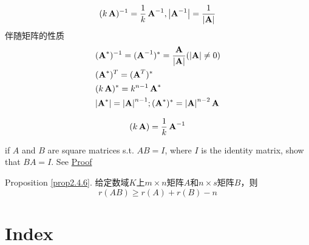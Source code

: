 \documentclass[11pt]{article}
\begin{document}
\begin{equation*}
(k\bA)^{-1}=\frac{1}{k}\bA^{-1},\abs{\bA^{-1}}=\frac{1}{\abs{\bA}}
\end{equation*}
伴随矩阵的性质
\begin{align*}
&(\bA^*)^{-1}=(\bA^{-1})^*=\frac{\bA}{\abs{\bA}}(\abs{\bA}\neq0)\\
&(\bA^*)^T=(\bA^T)^*\\
&(k\bA)^*=k^{n-1}\bA^*\\
&\abs{\bA^*}=\abs{\bA}^{n-1};(\bA^*)^*=\abs{\bA}^{n-2}\bA
\end{align*}

\begin{equation*}
(k\operatorname{\textbf{A}})=\frac{1}{k}\operatorname{\textbf{A}}^{-1}
\end{equation*}

if \(A\) and \(B\) are square matrices s.t. \(AB=I\), where \(I\) is the
identity matrix, show that \(BA=I\). See \href{https://math.stackexchange.com/questions/3852/if-ab-i-then-ba-i}{Proof}

Proposition \ref{prop2.4.6}.
给定数域\(K\)上\(m\times n\)矩阵\(A\)和\(n\times s\)矩阵\(B\)，则
\begin{equation*}
r(AB)\ge r(A)+r(B)-n
\end{equation*}

\section{Index}
\label{sec:orgc18eb19}
\renewcommand{\indexname}{}
\printindex
\end{document}
